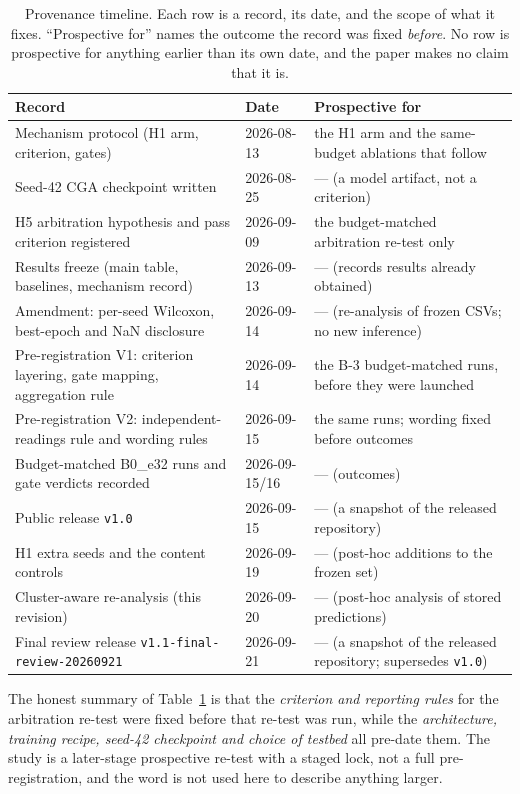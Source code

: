 \documentclass[pdflatex,sn-mathphys-num]{sn-jnl}
\theoremstyle{thmstyleone}%
\theoremstyle{thmstyletwo}%
\theoremstyle{thmstylethree}%
\begin{document}
\begin{table}[t]
\caption{Provenance timeline. Each row is a record, its date, and the scope of what it fixes. ``Prospective for'' names the outcome the record was fixed \emph{before}. No row is prospective for anything earlier than its own date, and the paper makes no claim that it is.}
\label{tab:timeline}%
\footnotesize
\setlength{\tabcolsep}{4pt}
\begin{tabular}{@{}p{4.45cm}p{1.95cm}p{5.6cm}@{}}
\toprule
Record & Date & Prospective for \\
\midrule
Mechanism protocol (H1 arm, criterion, gates) & 2026-08-13 & the H1 arm and the same-budget ablations that follow \\
Seed-42 CGA checkpoint written & 2026-08-25 & --- (a model artifact, not a criterion) \\
H5 arbitration hypothesis and pass criterion registered & 2026-09-09 & the budget-matched arbitration re-test only \\
Results freeze (main table, baselines, mechanism record) & 2026-09-13 & --- (records results already obtained) \\
Amendment: per-seed Wilcoxon, best-epoch and NaN disclosure & 2026-09-14 & --- (re-analysis of frozen CSVs; no new inference) \\
Pre-registration V1: criterion layering, gate mapping, aggregation rule & 2026-09-14 & the B-3 budget-matched runs, before they were launched \\
Pre-registration V2: independent-readings rule and wording rules & 2026-09-15 & the same runs; wording fixed before outcomes \\
Budget-matched B0\_e32 runs and gate verdicts recorded & 2026-09-15/16 & --- (outcomes) \\
Public release \texttt{v1.0} & 2026-09-15 & --- (a snapshot of the released repository) \\
H1 extra seeds and the content controls & 2026-09-19 & --- (post-hoc additions to the frozen set) \\
Cluster-aware re-analysis (this revision) & 2026-09-20 & --- (post-hoc analysis of stored predictions) \\
Final review release \texttt{v1.1-final-review-20260921} & 2026-09-21 & --- (a snapshot of the released repository; supersedes \texttt{v1.0}) \\
\bottomrule
\end{tabular}
\end{table}

The honest summary of Table~\ref{tab:timeline} is that the \emph{criterion and reporting rules} for the arbitration re-test were fixed before that re-test was run, while the \emph{architecture, training recipe, seed-42 checkpoint and choice of testbed} all pre-date them. The study is a later-stage prospective re-test with a staged lock, not a full pre-registration, and the word is not used here to describe anything larger.
\end{document}
